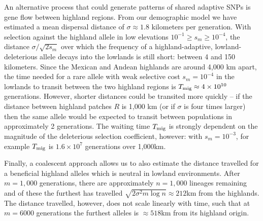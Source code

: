 An alternative process that could generate patterns of shared adaptive SNPs is gene flow between highland regions.
From our demographic model we have estimated a mean dispersal distance of $\sigma \approx 1.8$ kilometers per generation.
With selection against the highland allele in low elevations $10^{-1} \ge s_m \ge 10^{-4}$, the distance $\sigma/\sqrt{2s_m}$ over which the frequency of a highland-adaptive, lowland-deleterious allele decays into the lowlands is still short: between 4 and 150 kilometers.
Since the Mexican and Andean highlands are around 4,000 km apart, the time needed for a rare allele with weak selective cost $s_m=10^{-4}$ in the lowlands to transit between the two highland regions is $T_{\text{mig}} \approx 4 \times 10^{10}$ generations. 
However, shorter distances could be transited more quickly -- if the distance between highland patches $R$ is 1,000 km (or if $\sigma$ is four times larger) then the same allele would be expected to transit between populations in approximately 2 generations.
The waiting time $T_{\text{mig}}$ is  strongly dependent on the magnitude of the deleterious selection coefficient, however: with $s_m=10^{-3}$, for example $T_{\text{mig}}$ is $1.6 \times 10^7$ generations over 1,000km.

Finally, a coalescent approach allows us to also estimate the distance travelled for a beneficial highland alleles which is neutral in lowland environments.  After $m=1,000$ generations, there are approximately $n=1,000$ lineages remaining and of these the furthest has travelled  $\sqrt{2 \sigma^2 m \log n} \approx 212$km from the highlands.  The distance travelled, however, does not scale linearly with time, such that at  $m=6000$ generations the furthest alleles is $\approx 518$km from its highland origin. 

